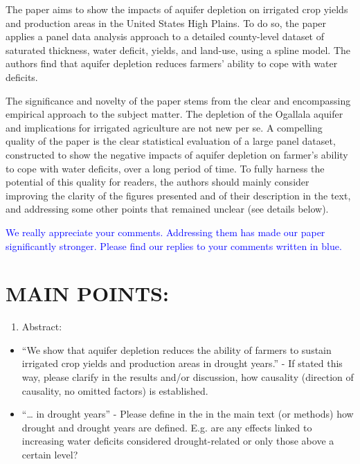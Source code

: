 \documentclass[
]{article}
\author{}
\date{\vspace{-2.5em}}
\providecommand{\tightlist}{%
  \setlength{\itemsep}{0pt}\setlength{\parskip}{0pt}}
\begin{document}
The paper aims to show the impacts of aquifer depletion on irrigated
crop yields and production areas in the United States High Plains. To do
so, the paper applies a panel data analysis approach to a detailed
county-level dataset of saturated thickness, water deficit, yields, and
land-use, using a spline model. The authors find that aquifer depletion
reduces farmers' ability to cope with water deficits.

The significance and novelty of the paper stems from the clear and
encompassing empirical approach to the subject matter. The depletion of
the Ogallala aquifer and implications for irrigated agriculture are not
new per se. A compelling quality of the paper is the clear statistical
evaluation of a large panel dataset, constructed to show the negative
impacts of aquifer depletion on farmer's ability to cope with water
deficits, over a long period of time. To fully harness the potential of
this quality for readers, the authors should mainly consider improving
the clarity of the figures presented and of their description in the
text, and addressing some other points that remained unclear (see
details below).

\textcolor{blue}{We really appreciate your comments. Addressing them has made our paper significantly stronger. Please find our replies to your comments written in blue.}

\hypertarget{main-points}{%
\section{MAIN POINTS:}\label{main-points}}

\begin{enumerate}
\def\labelenumi{\arabic{enumi}.}
\tightlist
\item
  Abstract:
\end{enumerate}

\begin{itemize}
\tightlist
\item
  ``We show that aquifer depletion reduces the ability of farmers to
  sustain irrigated crop yields and production areas in drought years.''
  - If stated this way, please clarify in the results and/or discussion,
  how causality (direction of causality, no omitted factors) is
  established.
\end{itemize}

\textcolor{blue}{}

\begin{itemize}
\tightlist
\item
  ``\ldots{} in drought years'' - Please define in the in the main text
  (or methods) how drought and drought years are defined. E.g. are any
  effects linked to increasing water deficits considered drought-related
  or only those above a certain level?
\end{itemize}
\end{document}
